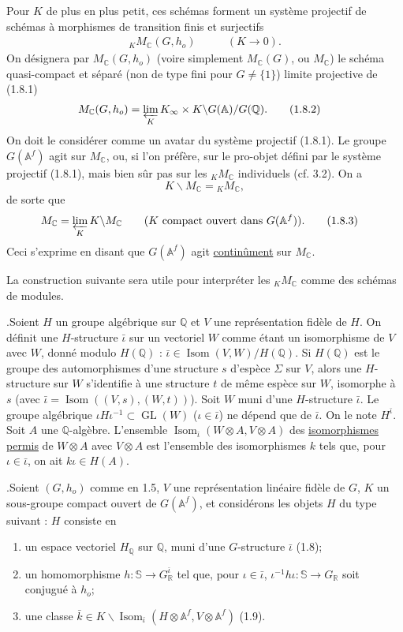 \documentclass[10pt]{article}
\newcommand{\A}{\mathbb A}
\newcommand{\Af}{\mathbb A^f}
\newcommand{\C}{\mathbb C}
\newcommand{\Q}{\mathbb Q}
\newcommand{\R}{\mathbb R}
\newcommand{\bS}{\mathbb S}
\newcommand{\GL}{\operatorname{GL}}
\newcommand{\Isom}{\operatorname{Isom}}
\newcommand{\limproj}{\varprojlim}
\newcommand{\MC}{M_{\C}}
\begin{document}
Pour $K$ de plus en plus petit, ces schémas forment un système projectif de schémas à morphismes de transition finis et surjectifs
\begingroup
\makeatletter
\tagsleft@true
\makeatother
\begin{align}
{}_K\MC(G,h_o)&\qquad(K\to0). \tag{1.8.1}
\end{align}
\endgroup
On désignera par $\MC(G,h_o)$ (voire simplement $\MC(G)$, ou $\MC$) le schéma quasi-compact et séparé (non de type fini pour $G\ne\{1\}$) limite projective de (1.8.1)
\begingroup
\makeatletter
\tagsleft@true
\makeatother
\begin{align}
\MC(G,h_o)&=\limproj_K K_\infty\times K\backslash G(\A)/G(\Q). \tag{1.8.2}
\end{align}
\endgroup
On doit le considérer comme un avatar du système projectif (1.8.1). Le groupe $G(\Af)$ agit sur $\MC$, ou, si l'on préfère, sur le pro-objet défini par le système projectif (1.8.1), mais bien sûr pas sur les ${}_K\MC$ individuels (cf. 3.2). On a
\[
K\backslash\MC={}_K\MC,
\]
de sorte que
\begingroup
\makeatletter
\tagsleft@true
\makeatother
\begin{align}
\MC&=\limproj_K K\backslash\MC\qquad(K\text{ compact ouvert dans }G(\Af)). \tag{1.8.3}
\end{align}
\endgroup
Ceci s'exprime en disant que $G(\Af)$ agit \uline{continûment} sur $\MC$.

La construction suivante sera utile pour interpréter les ${}_K\MC$ comme des schémas de modules.

.\quad Soient $H$ un groupe algébrique sur $\Q$ et $V$ une représentation fidèle de $H$. On définit une $H$-structure $\bar\iota$ sur un vectoriel $W$ comme étant un isomorphisme de $V$ avec $W$, donné modulo $H(\Q)$ : $\bar\iota\in\Isom(V,W)/H(\Q)$. Si $H(\Q)$ est le groupe des automorphismes d'une structure $s$ d'espèce $\Sigma$ sur $V$, alors une $H$-structure sur $W$ s'identifie à une structure $t$ de même espèce sur $W$, isomorphe à $s$ (avec $\bar\iota=\Isom((V,s),(W,t))$). Soit $W$ muni d'une $H$-structure $\bar\iota$. Le groupe algébrique $\iota H\iota^{-1}\subset\GL(W)$ ($\iota\in\bar\iota$) ne dépend que de $\bar\iota$. On le note $H^{\bar\iota}$. Soit $A$ une $\Q$-algèbre. L'ensemble $\Isom_{\bar\iota}(W\otimes A,V\otimes A)$ des \uline{isomorphismes permis} de $W\otimes A$ avec $V\otimes A$ est l'ensemble des isomorphismes $k$ tels que, pour $\iota\in\bar\iota$, on ait $k\iota\in H(A)$.

.\quad Soient $(G,h_o)$ comme en 1.5, $V$ une représentation linéaire fidèle de $G$, $K$ un sous-groupe compact ouvert de $G(\Af)$, et considérons les objets $H$ du type suivant : $H$ consiste en
\begin{enumerate}[label=(\alph*),leftmargin=2.6em]
\item un espace vectoriel $H_\Q$ sur $\Q$, muni d'une $G$-structure $\bar\iota$ (1.8);
\item un homomorphisme $h:\bS\to G^{\bar\iota}_\R$ tel que, pour $\iota\in\bar\iota$, $\iota^{-1}h\iota:\bS\to G_\R$ soit conjugué à $h_o$;
\item une classe $\bar k\in K\backslash\Isom_{\bar\iota}(H\otimes\Af,V\otimes\Af)$ (1.9).
\end{enumerate}
\end{document}
